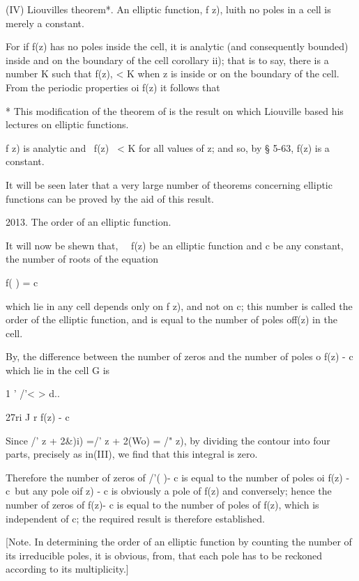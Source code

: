 (IV) Liouvilles theorem*. An elliptic function, f z), luith no poles
in a cell is merely a constant.

For if f(z) has no poles inside the cell, it is analytic (and
consequently bounded) inside and on the boundary of the cell 
corollary ii); that is to say, there is a number K such that f(z), <
K when z is inside or on the boundary of the cell. From the periodic
properties oi f(z) it follows that

* This modification of the theorem of is the result on which
Liouville based his lectures on elliptic functions.

%
%

f z) is analytic and \ f(z) \ < K for all values of z; and so, by §
5-63, f(z) is a constant.

It will be seen later that a very large number of theorems concerning
elliptic functions can be proved by the aid of this result.

2013. The order of an elliptic function.

It will now be shewn that, \ \ f(z) be an elliptic function and c be
any constant, the number of roots of the equation

f( ) = c

which lie in any cell depends only on f z), and not on c; this number
is called the order of the elliptic function, and is equal to the
number of poles off(z) in the cell.

By, the difference between the number of zeros and the number
of poles o f(z) - c which lie in the cell G is

1 ' /'< > d..

27ri J r f(z) - c

Since /' z + 2\&)i) =/' z + 2(Wo) = /" z), by dividing the contour
into four parts, precisely as in(III), we find that this
integral is zero.

Therefore the number of zeros of /'( )- c is equal to the number of
poles oi f(z) - c\ but any pole oif z) - c is obviously a pole of f(z)
and conversely; hence the number of zeros of f(z)- c is equal to the
number of poles of f(z), which is independent of c; the required
result is therefore established.

[Note. In determining the order of an elliptic function by counting
the number of its irreducible poles, it is obvious, from, that
each pole has to be reckoned according to its multiplicity.]

